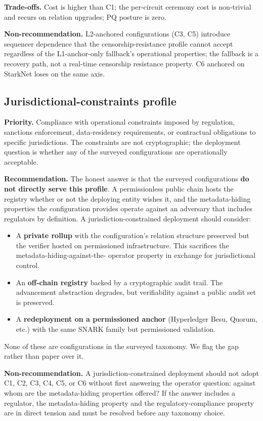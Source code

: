 \textbf{Trade-offs.} Cost is higher than C1; the per-circuit
ceremony cost is non-trivial and recurs on relation upgrades; PQ
posture is zero.

\textbf{Non-recommendation.} L2-anchored configurations (C3, C5)
introduce sequencer dependence that the censorship-resistance
profile cannot accept regardless of the L1-anchor-only fallback's
operational properties; the fallback is a recovery path, not a
real-time censorship resistance property. C6 anchored on StarkNet
loses on the same axis.

\subsection{Jurisdictional-constraints profile}
\label{sec:rec-jurisdiction}

\textbf{Priority.} Compliance with operational constraints imposed
by regulation, sanctions enforcement, data-residency requirements,
or contractual obligations to specific jurisdictions. The
constraints are not cryptographic; the deployment question is
whether any of the surveyed configurations are operationally
acceptable.

\textbf{Recommendation.} The honest answer is that the surveyed
configurations \textbf{do not directly serve this profile}. A
permissionless public chain hosts the registry whether or not the
deploying entity wishes it, and the metadata-hiding properties the
configuration provides operate against an adversary that includes
regulators by definition. A jurisdiction-constrained deployment
should consider:
\begin{itemize}
  \item A \textbf{private rollup} with the configuration's relation
    structure preserved but the verifier hosted on permissioned
    infrastructure. This sacrifices the metadata-hiding-against-the-
    operator property in exchange for jurisdictional control.
  \item An \textbf{off-chain registry} backed by a cryptographic
    audit trail. The advancement abstraction degrades, but
    verifiability against a public audit set is preserved.
  \item A \textbf{redeployment on a permissioned anchor} (Hyperledger
    Besu, Quorum, etc.) with the same SNARK family but
    permissioned validation.
\end{itemize}
None of these are configurations in the surveyed taxonomy. We flag
the gap rather than paper over it.

\textbf{Non-recommendation.} A jurisdiction-constrained deployment
should not adopt C1, C2, C3, C4, C5, or C6 without first answering
the operator question: against whom are the metadata-hiding
properties offered? If the answer includes a regulator, the
metadata-hiding property and the regulatory-compliance property are
in direct tension and must be resolved before any taxonomy choice.

